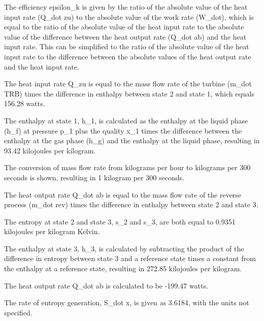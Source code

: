 The efficiency epsilon_k is given by the ratio of the absolute value of the heat input rate (Q_dot zu) to the absolute value of the work rate (W_dot), which is equal to the ratio of the absolute value of the heat input rate to the absolute value of the difference between the heat output rate (Q_dot ab) and the heat input rate. This can be simplified to the ratio of the absolute value of the heat input rate to the difference between the absolute values of the heat output rate and the heat input rate.

The heat input rate Q_zu is equal to the mass flow rate of the turbine (m_dot TRB) times the difference in enthalpy between state 2 and state 1, which equals 156.28 watts.

The enthalpy at state 1, h_1, is calculated as the enthalpy at the liquid phase (h_f) at pressure p_1 plus the quality x_1 times the difference between the enthalpy at the gas phase (h_g) and the enthalpy at the liquid phase, resulting in 93.42 kilojoules per kilogram.

The conversion of mass flow rate from kilograms per hour to kilograms per 300 seconds is shown, resulting in 1 kilogram per 300 seconds.

The heat output rate Q_dot ab is equal to the mass flow rate of the reverse process (m_dot rev) times the difference in enthalpy between state 2 and state 3.

The entropy at state 2 and state 3, s_2 and s_3, are both equal to 0.9351 kilojoules per kilogram Kelvin.

The enthalpy at state 3, h_3, is calculated by subtracting the product of the difference in entropy between state 3 and a reference state times a constant from the enthalpy at a reference state, resulting in 272.85 kilojoules per kilogram.

The heat output rate Q_dot ab is calculated to be -199.47 watts.

The rate of entropy generation, S_dot x, is given as 3.6184, with the units not specified.